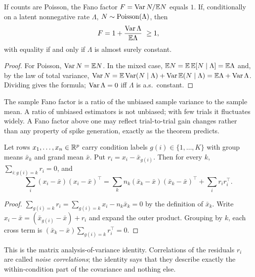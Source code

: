 \begin{theorem}\label{ars:count-003}
If counts are Poisson, the Fano factor $F=\operatorname{Var} N/\mathbb E N$ equals $1$. If, conditionally on a latent nonnegative rate $\Lambda$, $N\sim\operatorname{Poisson}(\Lambda)$, then
\[F=1+\frac{\operatorname{Var}\Lambda}{\mathbb E\Lambda}\ \ge 1,\]
with equality if and only if $\Lambda$ is almost surely constant.
\end{theorem}
\begin{proof}
For Poisson, $\operatorname{Var} N=\mathbb E N$. In the mixed case, $\mathbb E N=\mathbb E\,\mathbb E[N\mid\Lambda]=\mathbb E\Lambda$ and, by the law of total variance, $\operatorname{Var} N=\mathbb E\operatorname{Var}(N\mid\Lambda)+\operatorname{Var}\mathbb E(N\mid\Lambda)=\mathbb E\Lambda+\operatorname{Var}\Lambda$. Dividing gives the formula; $\operatorname{Var}\Lambda=0$ iff $\Lambda$ is a.s.\ constant.
\end{proof}
\begin{remark}
The sample Fano factor is a ratio of the unbiased sample variance to the sample mean. A ratio of unbiased estimators is not unbiased; with few trials it fluctuates widely. A Fano factor above one may reflect trial-to-trial gain changes rather than any property of spike generation, exactly as the theorem predicts.
\end{remark}

\begin{theorem}\label{ars:count-004}
Let rows $x_1,\dots,x_n\in\mathbb R^p$ carry condition labels $g(i)\in\{1,\dots,K\}$ with group means $\bar x_k$ and grand mean $\bar x$. Put $r_i=x_i-\bar x_{g(i)}$. Then for every $k$, $\sum_{i:g(i)=k}r_i=0$, and
\[\sum_{i}(x_i-\bar x)(x_i-\bar x)^\top=\sum_{k} n_k(\bar x_k-\bar x)(\bar x_k-\bar x)^\top+\sum_i r_ir_i^\top .\]
\end{theorem}
\begin{proof}
$\sum_{g(i)=k}r_i=\sum_{g(i)=k}x_i-n_k\bar x_k=0$ by the definition of $\bar x_k$. Write $x_i-\bar x=(\bar x_{g(i)}-\bar x)+r_i$ and expand the outer product. Grouping by $k$, each cross term is $(\bar x_k-\bar x)\sum_{g(i)=k}r_i^\top=0$.
\end{proof}
This is the matrix analysis-of-variance identity. Correlations of the residuals $r_i$ are called \emph{noise correlations}; the identity says that they describe exactly the within-condition part of the covariance and nothing else.

